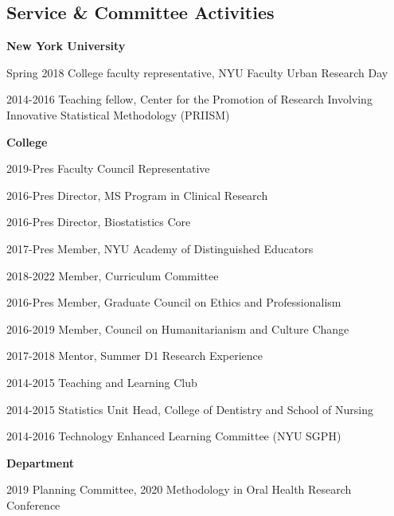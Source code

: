 \documentclass[margin,line]{res}
\begin{document}
\begin{resume}
\section{\sc Service \& Committee Activities} 
{\bf New York University} \hfill 

\vspace*{-2.5mm}
Spring 2018	College faculty representative, NYU Faculty Urban Research Day

\vspace*{-2.5mm}
2014-2016	Teaching fellow, Center for the Promotion of Research Involving Innovative 
Statistical Methodology (PRIISM)

{\bf College} \hfill 

\vspace*{-2.5mm}
2019-Pres	Faculty Council Representative 

\vspace*{-2.5mm}
2016-Pres	Director, MS Program in Clinical Research

\vspace*{-2.5mm}
2016-Pres	Director, Biostatistics Core

\vspace*{-2.5mm}
2017-Pres	Member, NYU Academy of Distinguished Educators

\vspace*{-2.5mm}
2018-2022	Member, Curriculum Committee 

\vspace*{-2.5mm}
2016-Pres	Member, Graduate Council on Ethics and Professionalism

\vspace*{-2.5mm}
2016-2019	Member, Council on Humanitarianism and Culture Change

\vspace*{-2.5mm}
2017-2018	Mentor, Summer D1 Research Experience

\vspace*{-2.5mm}
2014-2015 	Teaching and Learning Club

\vspace*{-2.5mm}
2014-2015	Statistics Unit Head, College of Dentistry and School of Nursing

\vspace*{-2.5mm}
2014-2016	Technology Enhanced Learning Committee (NYU SGPH)


{\bf Department} \hfill 

\vspace*{-2.5mm}
2019 Planning Committee, 2020 Methodology in Oral Health Research Conference


\end{resume}
\end{document}
